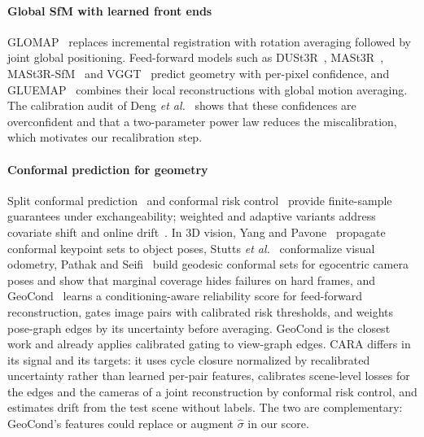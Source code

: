 \paragraph*{Global SfM with learned front ends} GLOMAP~\cite{pan2024glomap} replaces incremental registration with rotation averaging followed by joint global positioning. Feed-forward models such as DUSt3R~\cite{wang2024dust3r}, MASt3R~\cite{leroy2024mast3r}, MASt3R-SfM~\cite{duisterhof2025mast3rsfm} and VGGT~\cite{wang2025vggt} predict geometry with per-pixel confidence, and GLUEMAP~\cite{pan2026gluemap} combines their local reconstructions with global motion averaging. The calibration audit of Deng \emph{et al.}~\cite{deng2026audit} shows that these confidences are overconfident and that a two-parameter power law reduces the miscalibration, which motivates our recalibration step.

\paragraph*{Conformal prediction for geometry} Split conformal prediction~\cite{vovk2005algorithmic,lei2018distribution} and conformal risk control~\cite{angelopoulos2024crc} provide finite-sample guarantees under exchangeability; weighted and adaptive variants address covariate shift and online drift~\cite{tibshirani2019covariate,gibbs2021adaptive,barber2023beyond}. In 3D vision, Yang and Pavone~\cite{yang2023object} propagate conformal keypoint sets to object poses, Stutts \emph{et al.}~\cite{stutts2023conformal} conformalize visual odometry, Pathak and Seifi~\cite{pathak2026adaptive} build geodesic conformal sets for egocentric camera poses and show that marginal coverage hides failures on hard frames, and GeoCond~\cite{ahmedt2026geocond} learns a conditioning-aware reliability score for feed-forward reconstruction, gates image pairs with calibrated risk thresholds, and weights pose-graph edges by its uncertainty before averaging. GeoCond is the closest work and already applies calibrated gating to view-graph edges. CARA differs in its signal and its targets: it uses cycle closure normalized by recalibrated uncertainty rather than learned per-pair features, calibrates scene-level losses for the edges and the cameras of a joint reconstruction by conformal risk control, and estimates drift from the test scene without labels. The two are complementary: GeoCond's features could replace or augment $\hat\sigma$ in our score.



